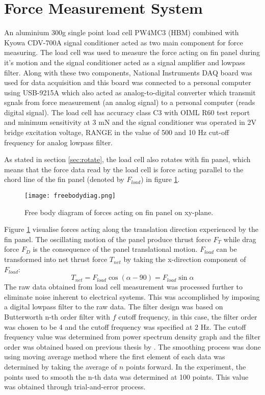 \section{Force Measurement System}
\label{sec:measure}
An aluminium 300g single point load cell PW4MC3 (HBM) combined with Kyowa CDV-700A signal conditioner acted as two main component for force measuring. The load cell was used to measure the force acting on fin panel during it's motion and the signal conditioner acted as a signal amplifier and lowpass filter. Along with these two components, National Instruments DAQ board was used for data acquisition and this board was connected to a personal computer using USB-9215A which also acted as analog-to-digital converter which transmit sgnals from force measurement (an analog signal) to a personal computer (reads digital signal). The load cell has accuracy class C3 with OIML R60 test report and minimum sensitivity at 3 mN and the signal conditioner was operated in 2V bridge excitation voltage, RANGE in the value of 500 and 10 Hz cut-off frequency for analog lowpass filter.\par
As stated in section \ref{sec:rotate}, the load cell also rotates with fin panel, which means that the force data read by the load cell is force acting parallel to the chord line of the fin panel (denoted by $F_{load}$) in figure \ref{fig:freebodydiag}.
\begin{figure}[H]
    \centering
    \texttt{[image: freebodydiag.png]}
    \caption{Free body diagram of forces acting on fin panel on xy-plane.}
    \label{fig:freebodydiag}
\end{figure}
Figure \ref{fig:freebodydiag} visualise forces acting along the translation direction experienced by the fin panel. The oscillating motion of the panel produce thrust force $F_{T}$ while drag force $F_{D}$ is the consequence of the panel translational motion. $F_{load}$ can be transformed into net thrust force $T_{net}$ by taking the x-direction component of $F_{load}$:
\begin{equation}
    T_{net} = F_{load} \cos \left(\alpha - 90\right) = F_{load} \sin\alpha
    \label{eq:load2net}
\end{equation}
The raw data obtained from load cell measurement was processed further to eliminate noise inherent to electrical systems. This was accomplished by imposing a digital lowpass filter to the raw data. The filter design was based on Butterworth n-th order filter with $f$ cutoff frequency, in this case, the filter order was chosen to be 4 and the cutoff frequency was specified at 2 Hz. The cutoff frequency value was determined from power spectrum density graph and the filter order was obtained based on previous thesis by \citet{hiroki}. The smoothing process was done using moving average method where the first element of each data was determined by taking the average of $n$ points forward. In the experiment, the points used to smooth the n-th data was determined at 100 points. This value was obtained through trial-and-error process.
